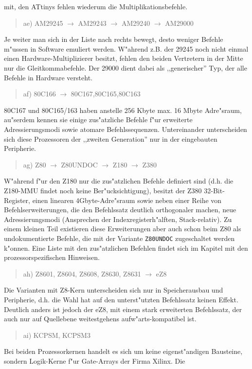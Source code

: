 \documentclass[12pt,a4paper,twoside]{report}
\newcommand{\tty}[1]{{\tt #1}}
\begin{document}
mit, den ATtinys fehlen wiederum die Multiplikationsbefehle.
\begin{quote}
ae) AM29245 $\rightarrow$ AM29243 $\rightarrow$ AM29240 $\rightarrow$ AM29000
\end{quote}
Je weiter man sich in der Liste nach rechts bewegt, desto weniger
Befehle m"ussen in Software emuliert werden.  W"ahrend z.B. der 29245
noch nicht einmal einen Hardware-Multiplizierer besitzt, fehlen den
beiden Vertretern in der Mitte nur die Gleitkommabefehle.  Der 29000
dient dabei als ,,generischer'' Typ, der alle Befehle in Hardware versteht.
\begin{quote}
af) 80C166 $\longrightarrow$ 80C167,80C165,80C163
\end{quote}
80C167 und 80C165/163 haben anstelle 256 Kbyte max. 16 Mbyte Adre"sraum,
au"serdem kennen sie einige zus"atzliche Befehle f"ur erweiterte
Adressierungsmodi sowie atomare Befehlssequenzen.  Untereinander
unterscheiden sich diese Prozessoren der ,,zweiten Generation'' nur in der
eingebauten Peripherie.
\begin{quote}
ag) Z80 $\rightarrow$ Z80UNDOC $\rightarrow$ Z180 $\rightarrow$ Z380
\end{quote}
W"ahrend f"ur den Z180 nur die zus"atzlichen Befehle definiert sind
(d.h. die Z180-MMU findet noch keine Ber"ucksichtigung), besitzt der
Z380 32-Bit-Register, einen linearen 4Gbyte-Adre"sraum sowie neben
einer Reihe von Befehlserweiterungen, die den Befehlssatz deutlich
orthogonaler machen, neue Adressierungsmodi (Ansprechen der
Indexregisterh"alften, Stack-relativ).  Zu einem kleinen Teil existieren
diese Erweiterungen aber auch schon beim Z80 als undokumentierte
Befehle, die mit der Variante \tty{Z80UNDOC} zugeschaltet werden
k"onnen.  Eine Liste mit den zus"atzlichen Befehlen findet sich im
Kapitel mit den prozessorspezifischen Hinweisen.
\begin{quote}
ah) Z8601, Z8604, Z8608, Z8630, Z8631 $\rightarrow$ eZ8
\end{quote}
Die Varianten mit Z8-Kern unterscheiden sich nur in
Speicherausbau und Peripherie, d.h. die Wahl hat auf den
unterst"utzten Befehlssatz keinen Effekt.  Deutlich anders ist
jedoch der eZ8, mit einem stark erweiterten Befehlssatz, der auch
nur auf Quellebene weitestgehens aufw"arts-kompatibel ist.
\begin{quote}
ai) KCPSM, KCPSM3
\end{quote}
Bei beiden Prozessorkernen handelt es sich um keine eigenst"andigen
Bausteine, sondern Logik-Kerne f"ur Gate-Arrays der Firma Xilinx.  Die
\end{document}
